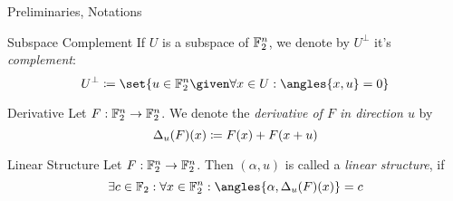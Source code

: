 \begin{frame}{Preliminaries, Notations}
    \begin{block}{Subspace Complement}
        If $U$ is a subspace of $\mathbb{F}_2^n$, we denote by $U^\perp$ it's \emph{complement}:
        \vspace{-0.5em}
        \begin{equation*}
            U^\perp \coloneqq \set{u \in \F_2^n \given \forall x \in U: \angles{x, u} = 0}
            \vspace*{-0.5em}
        \end{equation*}
    \end{block}
    \begin{block}{Derivative}
        Let $F : \mathbb{F}_2^n \to \mathbb{F}_2^n$.
        We denote the \emph{derivative of $F$ in direction $u$} by
        \vspace*{-0.5em}
        \begin{equation*}
            \Delta_u(F)(x) \coloneqq F(x) + F(x + u)
            \vspace*{-0.5em}
        \end{equation*}
    \end{block}
    \begin{block}{Linear Structure}
        Let $F : \mathbb{F}_2^n \to \mathbb{F}_2^n$.
        Then $(\alpha, u)$ is called a \emph{linear structure}, if
        \vspace*{-0.5em}
        \begin{equation*}
            \exists c \in \F_2 : \forall x \in \F_2^n : \angles{\alpha, \Delta_u(F)(x)} = c
            \vspace*{-0.5em}
        \end{equation*}
    \end{block}
\end{frame}

